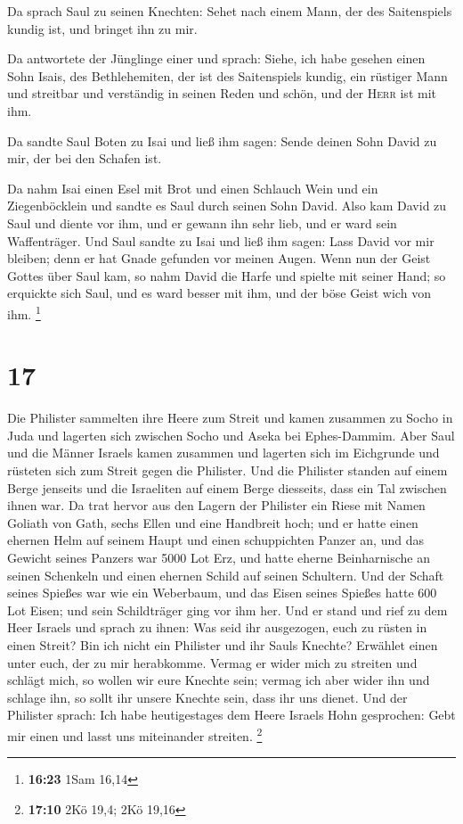  Da sprach Saul zu seinen Knechten: Sehet nach einem
Mann, der des Saitenspiels kundig ist, und bringet ihn zu mir.

 Da antwortete der Jünglinge einer und sprach: Siehe, ich
habe gesehen einen Sohn Isais, des Bethlehemiten, der ist des
Saitenspiels kundig, ein rüstiger Mann und streitbar und verständig in
seinen Reden und schön, und der \textsc{Herr} ist mit ihm.

 Da sandte Saul Boten zu Isai und ließ ihm sagen: Sende
deinen Sohn David zu mir, der bei den Schafen ist.

 Da nahm Isai einen Esel mit Brot und einen Schlauch Wein
und ein Ziegenböcklein und sandte es Saul durch seinen Sohn David.
 Also kam David zu Saul und diente vor ihm, und er gewann
ihn sehr lieb, und er ward sein Waffenträger.  Und Saul
sandte zu Isai und ließ ihm sagen: Lass David vor mir bleiben; denn er
hat Gnade gefunden vor meinen Augen.  Wenn nun der Geist
Gottes über Saul kam, so nahm David die Harfe und spielte mit seiner
Hand; so erquickte sich Saul, und es ward besser mit ihm, und der böse
Geist wich von ihm. \footnote{\textbf{16:23} 1Sam 16,14}

\hypertarget{section-3}{%
\section{17}\label{section-3}}

 Die Philister sammelten ihre Heere zum Streit und kamen
zusammen zu Socho in Juda und lagerten sich zwischen Socho und Aseka bei
Ephes-Dammim.  Aber Saul und die Männer Israels kamen
zusammen und lagerten sich im Eichgrunde und rüsteten sich zum Streit
gegen die Philister.  Und die Philister standen auf einem
Berge jenseits und die Israeliten auf einem Berge diesseits, dass ein
Tal zwischen ihnen war.  Da trat hervor aus den Lagern der
Philister ein Riese mit Namen Goliath von Gath, sechs Ellen und eine
Handbreit hoch;  und er hatte einen ehernen Helm auf
seinem Haupt und einen schuppichten Panzer an, und das Gewicht seines
Panzers war 5000 Lot Erz,  und hatte eherne Beinharnische
an seinen Schenkeln und einen ehernen Schild auf seinen Schultern.
 Und der Schaft seines Spießes war wie ein Weberbaum, und
das Eisen seines Spießes hatte 600 Lot Eisen; und sein Schildträger ging
vor ihm her.  Und er stand und rief zu dem Heer Israels
und sprach zu ihnen: Was seid ihr ausgezogen, euch zu rüsten in einen
Streit? Bin ich nicht ein Philister und ihr Sauls Knechte? Erwählet
einen unter euch, der zu mir herabkomme.  Vermag er wider
mich zu streiten und schlägt mich, so wollen wir eure Knechte sein;
vermag ich aber wider ihn und schlage ihn, so sollt ihr unsere Knechte
sein, dass ihr uns dienet.  Und der Philister sprach: Ich
habe heutigestages dem Heere Israels Hohn gesprochen: Gebt mir einen und
lasst uns miteinander streiten. \footnote{\textbf{17:10} 2Kö 19,4; 2Kö
  19,16}

